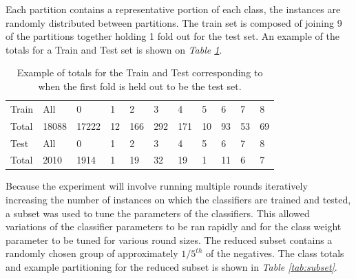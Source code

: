 \documentclass[ms]{nuthesis}
\begin{document}
\par Each partition contains a representative portion of each class, the instances are randomly
distributed between partitions. The train set is composed of joining 9 of the partitions together
holding 1 fold out for the test set. An example of the totals for a Train and Test set
is shown on \textit{Table \ref{tab:TrainTest}}.

\FloatBarrier
\begin{table}[H]
  \centering
  \begin{tabular}{|l||l||l||l||l||l||l||l||l||l||l|}\toprule
    Train & All & 0 & 1 & 2 & 3 & 4 & 5 & 6 & 7 & 8 \\
    Total & 18088 & 17222 & 12 & 166 & 292 & 171 & 10 & 93 & 53 & 69 \\ \midrule
    Test & All &  0 & 1 & 2 & 3 & 4 & 5 & 6 & 7 & 8 \\
    Total & 2010 & 1914 & 1 & 19 & 32 & 19 & 1 & 11 & 6 & 7 \\
 \bottomrule
  \end{tabular}
  \caption{Example of totals for the Train and Test corresponding to when the first fold is
  held out to be the test set.}
  \label{tab:TrainTest}
\end{table}
\FloatBarrier

\par Because the experiment will involve running multiple rounds iteratively increasing the
number of instances on which the classifiers are trained and tested, a subset was used to
tune the parameters of the classifiers. This allowed variations of the classifier parameters to be
ran rapidly and for the class weight parameter to be tuned for various round sizes. The reduced subset
contains a randomly chosen group of approximately $1/5^{th}$ of the negatives. The class totals and example
partitioning for the reduced subset is shown in \textit{Table \ref{tab:subset}}.
\end{document}
